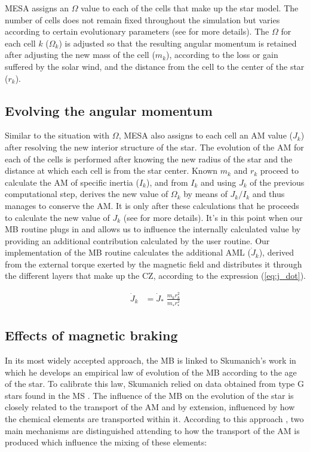 \documentclass[fleqn,usenatbib]{mnras}
\begin{document}
MESA assigns an $\Omega$ value to each of the cells that make up the star model. The number of cells does not remain fixed throughout the simulation but varies according to certain evolutionary parameters (see \citet{Paxton2015} for more details). The $\Omega$ for each cell $k$ ($\Omega_k$) is adjusted so that the resulting angular momentum is retained after adjusting the new mass of the cell ($m_k$), according to the loss or gain suffered by the solar wind, and the distance from the cell to the center of the star ($r_k$).\par

\subsection{Evolving the angular momentum}
Similar to the situation with $\Omega$, MESA also assigns to each cell an AM value ($J_k$) after resolving the new interior structure of the star. The evolution of the AM for each of the cells is performed after knowing the new radius of the star and the distance at which each cell is from the star center. Known $m_k$ and $r_k$ proceed to calculate the AM of specific inertia ($I_k$), and from $I_k$ and using $J_k$ of the previous computational step, derives the new value of $\Omega_k$ by means of $J_k/I_k$ and thus manages to conserve the AM. It is only after these calculations that he proceeds to calculate the new value of $J_k$ (see \citet{Paxton2015} for more details). It's in this point when our MB routine plugs in and allows us to influence the internally calculated value by providing an additional contribution calculated by the user routine. Our implementation of the MB routine calculates the additional AML ($\Dot{J}_{k}$), derived from the external torque exerted by the magnetic field and distributes it through the different layers that make up the CZ, according to the expression (\ref{eq:j_dot}).\par

\begin{ceqn}
\begin{align}
\Dot{J}_{k} &= \Dot{J}_*\;\frac{m^{}_{k} r^2_{k}}{m^{}_* r_*^2} \label{eq:k_jdot}
\end{align}
\end{ceqn}

\subsection{Effects of magnetic braking}
In its most widely accepted approach, the MB is linked to Skumanich's work in which he develops an empirical law of evolution of the MB according to the age of the star. To calibrate this law, Skumanich relied on data obtained from type G stars found in the MS \citep{Skumanich}. The influence of the MB on the evolution of the star is closely related to the transport of the AM and by extension, influenced by how the chemical elements are transported within it. According to this approach \citep{Meynet2010}, two main mechanisms are distinguished attending to how the transport of the AM is produced which influence the mixing of these elements:
\end{document}
